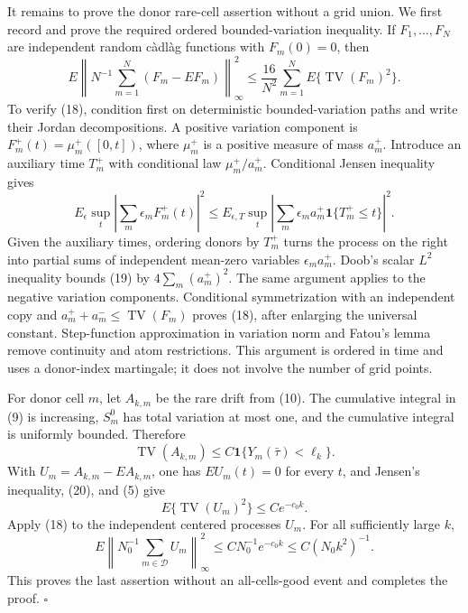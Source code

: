 It remains to prove the donor rare-cell assertion without a grid union.  We
first record and prove the required ordered bounded-variation inequality.  If
\(F_1,\ldots,F_N\) are independent random c\`adl\`ag functions with
\(F_m(0)=0\), then
\[
 E\left\|N^{-1}\sum_{m=1}^N(F_m-EF_m)\right\|_\infty^2
 \leq \frac{16}{N^2}\sum_{m=1}^N
 E\{\operatorname{TV}(F_m)^2\}.                          \tag{18}
\]
To verify (18), condition first on deterministic bounded-variation paths and
write their Jordan decompositions.  A positive variation component is
\(F_m^+(t)=\mu_m^+([0,t])\), where \(\mu_m^+\) is a positive measure of
mass \(a_m^+\).  Introduce an auxiliary time \(T_m^+\) with conditional law
\(\mu_m^+/a_m^+\).  Conditional Jensen inequality gives
\[
 E_\epsilon\sup_t\left|\sum_m\epsilon_mF_m^+(t)\right|^2
 \leq E_{\epsilon,T}\sup_t
 \left|\sum_m\epsilon_ma_m^+\mathbf 1\{T_m^+\leq t\}\right|^2. \tag{19}
\]
Given the auxiliary times, ordering donors by \(T_m^+\) turns the process on
the right into partial sums of independent mean-zero variables
\(\epsilon_ma_m^+\).  Doob's scalar \(L^2\) inequality bounds (19) by
\(4\sum_m(a_m^+)^2\).  The same argument applies to the negative variation
components.  Conditional symmetrization with an independent copy and
\(a_m^++a_m^-\leq\operatorname{TV}(F_m)\) proves (18), after enlarging the
universal constant.  Step-function approximation in variation norm and Fatou's
lemma remove continuity and atom restrictions.  This argument is ordered in
time and uses a donor-index martingale; it does not involve the number of grid
points.

For donor cell \(m\), let \(A_{k,m}\) be the rare drift from (10).  The
cumulative integral in (9) is increasing, \(S_m^0\) has total variation at
most one, and the cumulative integral is uniformly bounded.  Therefore
\[
 \operatorname{TV}(A_{k,m})
 \leq C\mathbf 1\{Y_m(\bar\tau)<\ell_k\}.                \tag{20}
\]
With \(U_m=A_{k,m}-EA_{k,m}\), one has
\(EU_m(t)=0\) for every \(t\), and Jensen's inequality, (20), and (5) give
\[
 E\{\operatorname{TV}(U_m)^2\}\leq Ce^{-c_0k}.
\]
Apply (18) to the independent centered processes \(U_m\).  For all
sufficiently large \(k\),
\[
 E\left\|N_0^{-1}\sum_{m\in\mathcal D}U_m\right\|_\infty^2
 \leq CN_0^{-1}e^{-c_0k}
 \leq C(N_0k^2)^{-1}.                                    \tag{21}
\]
This proves the last assertion without an all-cells-good event and completes
the proof. \(\square\)
